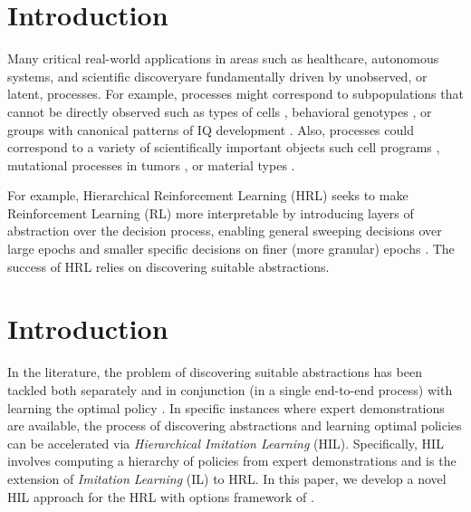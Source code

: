 \section{Introduction}
Many critical real-world applications in areas such as healthcare, autonomous systems, and scientific discoveryare fundamentally driven by unobserved, or latent, processes. 
For example, processes might correspond to subpopulations that cannot be directly observed such as
types of cells \citep{Gorsky:2020,Prabhakaran:2016}, behavioral genotypes \citep{Stevens:2019}, or
groups with canonical patterns of IQ development \citep{Bauer:2007}.
Also, processes could correspond to a variety of scientifically important objects such cell programs \citep{Kotliar_Identify_Cell_Idendity_Activity_NMF_2019,Buettner_FscLVM_ScalableVersatile_FA_2017,Risso_General_Flexible_Signal_Extract_2018},
mutational processes in tumors %
\citep{Levitin_DeNovo_Gene_Signature_Identification_2019,Kinker_Pan_Cancer_2020,Seplyarskiy_PopulationSequencingData_2021},
or material types
\citep{Fevotte_NonlinearHyperspectralUnmixing_2015,Rajabi_SpectralUnmixingHyperspectral_2015}.


For example,
Hierarchical Reinforcement Learning (HRL) seeks to make Reinforcement Learning (RL) more interpretable 
by introducing layers of abstraction over the decision process, 
enabling general sweeping decisions over large epochs and 
smaller specific decisions on finer (more granular) epochs \citep{SUTTON1999181, Barto2003}. 
The success of HRL relies on discovering suitable abstractions. 
\section{Introduction}
\label{sec:introduction}
In the literature, the problem of discovering suitable abstractions has been tackled both separately and in conjunction (in a single end-to-end process) with learning the optimal policy \citep{Barto2003}.
In specific instances where expert demonstrations are available, the process of discovering abstractions and learning optimal policies can be accelerated via \emph{Hierarchical Imitation Learning} (HIL).
Specifically, HIL involves computing a hierarchy of policies from expert demonstrations and is the extension of \emph{Imitation Learning} (IL) to HRL.
In this paper, we develop a novel HIL approach for the HRL with options framework of \citep{SUTTON1999181}.

